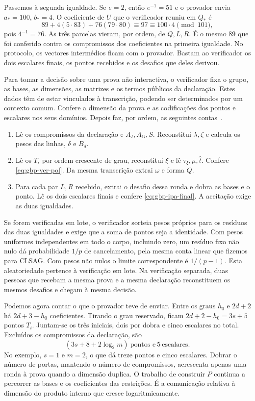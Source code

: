 Passemos à segunda igualdade. Se \(e=2\),
então \(e^{-1}=51\) e o provador envia \(a_*=100\), \(b_*=4\).
O coeficiente de \(U\) que o verificador reuniu em \(Q_*\) é
\[
 89+4(5\cdot83)+76(79\cdot80)\equiv97\equiv100\cdot4\pmod{101},
\]
pois \(4^{-1}=76\). As três parcelas vieram, por ordem, de
\(Q,L,R\). É o mesmo \(89\) que foi conferido contra os compromissos
dos coeficientes na primeira igualdade. No protocolo, os vectores
intermédios ficam com o provador. Bastam ao verificador os dois
escalares finais, os pontos recebidos e os desafios que deles derivou.



Para tomar a decisão sobre uma prova não interactiva, o verificador fixa
o grupo, as bases, as dimensões, as matrizes e os termos públicos da
declaração. Estes dados têm de estar vinculados à transcrição, podendo
ser determinados por um contexto comum. Confere a dimensão da prova e
as codificações dos pontos e escalares nos seus domínios. Depois faz,
por ordem, as seguintes contas~\cite{generalized-bulletproofs-fixed,monero-oxide-fcmp-source}.
\begin{enumerate}
 \item Lê os compromissos da declaração e \(A_I,A_O,S\). Reconstitui
 \(\lambda,\zeta\) e calcula os pesos das linhas, \(\delta\) e \(B_d\).
 \item Lê os \(T_i\) por ordem crescente de grau, reconstitui \(\xi\)
 e lê \(\tau_\xi,\mu,\widehat t\). Confere \eqref{eq:gbp-ver-pol}.
 Da mesma transcrição extrai \(\omega\) e forma \(Q\).
 \item Para cada par \(L,R\) recebido, extrai o desafio dessa ronda e
 dobra as bases e o ponto. Lê os dois escalares finais e confere
 \eqref{eq:gbp-ipa-final}. A aceitação exige as duas igualdades.
\end{enumerate}
Se forem verificadas em lote, o verificador sorteia pesos próprios para
os resíduos das duas igualdades e exige que a soma de pontos seja a
identidade. Com pesos uniformes independentes em todo o corpo, incluindo
zero, um resíduo fixo não nulo dá probabilidade \(1/p\) de cancelamento,
pela mesma conta linear que fizemos para CLSAG. Com pesos não nulos o
limite correspondente é \(1/(p-1)\). Esta aleatoriedade pertence à
verificação em lote. Na verificação separada, duas pessoas que recebam
a mesma prova e a mesma declaração reconstituem os mesmos desafios
e chegam à mesma decisão.

Podemos agora contar o que o provador teve de enviar. Entre os graus
\(h_0\) e \(2d+2\) há \(2d+3-h_0\) coeficientes. Tirando o grau
reservado, ficam \(2d+2-h_0=3s+5\) pontos \(T_i\). Juntam-se
os três iniciais, dois por dobra e cinco escalares no total. Excluídos
os compromissos da declaração, são
\[
 (3s+8+2\log_2 m)\ \text{pontos e}\ 5\ \text{escalares}.
\]
No exemplo, \(s=1\) e \(m=2\), o que dá treze pontos e cinco
escalares. Dobrar o número de portas, mantendo o número de compromissos,
acrescenta apenas uma ronda à prova quando a dimensão duplica.
O trabalho de construir \(P\) continua a percorrer as bases e os
coeficientes das restrições. É a comunicação relativa à dimensão
do produto interno que cresce logaritmicamente.

